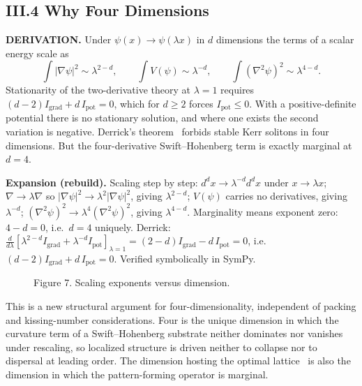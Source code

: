 \documentclass[11pt,a4paper]{article}
\newcommand{\expansion}[1]{\par\smallskip\noindent\textbf{Expansion (rebuild).} #1\par\smallskip}
\begin{document}
\subsection{III.4 Why Four Dimensions}
\textbf{DERIVATION.} Under $\psi(x) \to \psi(\lambda x)$ in $d$ dimensions the terms of a scalar energy scale as
\begin{equation}
\int |\nabla\psi|^2 \sim \lambda^{2-d}, \qquad \int V(\psi) \sim \lambda^{-d}, \qquad \int (\nabla^2\psi)^2 \sim \lambda^{4-d}.
\end{equation}
Stationarity of the two-derivative theory at $\lambda = 1$ requires $(d-2)I_{\mathrm{grad}} + d\,I_{\mathrm{pot}} = 0$, which for $d \geq 2$ forces $I_{\mathrm{pot}} \leq 0$. With a positive-definite potential there is no stationary solution, and where one exists the second variation is negative. Derrick's theorem~\cite{derrick1964} forbids stable Kerr solitons in four dimensions. But the four-derivative Swift--Hohenberg term is exactly marginal at $d = 4$.
\expansion{Scaling step by step: $d^dx \to \lambda^{-d}d^dx$ under $x \to \lambda x$; $\nabla \to \lambda\nabla$ so $|\nabla\psi|^2 \to \lambda^2|\nabla\psi|^2$, giving $\lambda^{2-d}$; $V(\psi)$ carries no derivatives, giving $\lambda^{-d}$; $(\nabla^2\psi)^2 \to \lambda^4(\nabla^2\psi)^2$, giving $\lambda^{4-d}$. Marginality means exponent zero: $4 - d = 0$, i.e.\ $d = 4$ uniquely. Derrick: $\tfrac{d}{d\lambda}[\lambda^{2-d}I_{\mathrm{grad}} + \lambda^{-d}I_{\mathrm{pot}}]_{\lambda=1} = (2-d)I_{\mathrm{grad}} - d\,I_{\mathrm{pot}} = 0$, i.e.\ $(d-2)I_{\mathrm{grad}} + d\,I_{\mathrm{pot}} = 0$. Verified symbolically in SymPy.}
\begin{figure}[h]
\centering
{}
\caption{Figure 7. Scaling exponents versus dimension.}
\end{figure}
This is a new structural argument for four-dimensionality, independent of packing and kissing-number considerations. Four is the unique dimension in which the curvature term of a Swift--Hohenberg substrate neither dominates nor vanishes under rescaling, so localized structure is driven neither to collapse nor to dispersal at leading order. The dimension hosting the optimal lattice~\cite{korkine1877} is also the dimension in which the pattern-forming operator is marginal.
\end{document}
